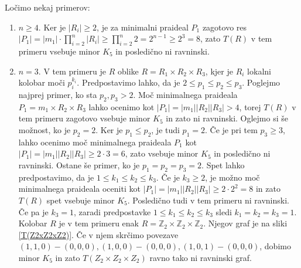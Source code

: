 \documentclass[a4paper, 12pt]{amsart}
\theoremstyle{definition} %
\theoremstyle{plain} %
\newcommand{\Z}{\mathbb Z}
\begin{document}
Ločimo nekaj primerov:
\begin{enumerate}
\item $n\ge 4$. Ker je $|R_i| \ge 2$, je za minimalni praideal $P_1$ zagotovo res $|P_1| = |m_1| \cdot \prod_{i=2}^n |R_i| \ge \prod_{i=2}^n 2 = 2^{n-1}\ge 2^3 = 8$, zato $T(R)$ v tem primeru vsebuje minor $K_5$ in posledično ni ravninski.

\item $n=3$. V tem primeru je $R$ oblike $R= R_1 \times R_2 \times R_3$, kjer je $R_i$ lokalni kolobar moči $p_i^{k_i}$. Predpostavimo lahko, da je $2\le p_1 \le p_2 \le p_3$. Poglejmo najprej primer, ko sta $p_2, p_3 > 2$. Moč minimalnega praideala $P_1 = m_1\times  R_2 \times R_3$ lahko ocenimo kot $|P_1| = |m_1| |R_2| |R_3| >4$, torej $T(R)$ v tem primeru zagotovo vsebuje minor $K_5$ in zato ni ravninski. Oglejmo si še možnost, ko je $p_2 = 2$. Ker je $p_1\le p_2$, je tudi $p_1=2$. Če je pri tem $p_3 \ge 3$,  lahko ocenimo moč minimalnega praideala $P_1$ kot $|P_1| = |m_1||R_2||R_3| \ge 2\cdot 3 = 6$, zato vsebuje minor $K_5$ in posledično ni ravninski. Ostane še primer, ko je $p_1 = p_2 = p_3 = 2$. Spet lahko predpostavimo, da je $1\le k_1 \le k_2 \le k_3$. Če je $k_3 \ge 2$, je možno moč minimalnega praideala oceniti kot $|P_1| = |m_1| |R_2||R_3| \ge 2 \cdot 2^2 = 8$ in zato $T(R)$ spet vsebuje minor $K_5$. Posledično tudi v tem primeru ni ravninski. Če pa je $k_3=1$, zaradi predpostavke $1 \le k_1 \le k_2 \le k_3$ sledi $k_1 = k_2 = k_3 = 1$. Kolobar $R$ je v tem primeru enak $R= \Z_2 \times \Z_2 \times \Z_2$. Njegov graf je na sliki \ref{T(Z2xZ2xZ2)}. Če v njem skrčimo povezave $(1,1,0)-(0,0,0),(1,0,0)-(0,0,0),(1,0,1)-(0,0,0)$, dobimo minor $K_5$ in zato $T(Z_2 \times Z_2 \times Z_2)$ ravno tako ni ravninski graf.

\begin{figure}[h!]
\centering
\end{figure}
\end{enumerate}
\end{document}
